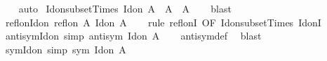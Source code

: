 \begin{isabellebody}
%
\isadelimproof
\ \ %
\endisadelimproof
%
\isatagproof
{}\isamarkupfalse%
\ auto%
\endisatagproof
{\isafoldproof}%
%
\isadelimproof
\isanewline
%
\endisadelimproof
\isanewline
{}\isamarkupfalse%
\ Id{\isacharunderscore}{\kern0pt}on{\isacharunderscore}{\kern0pt}subset{\isacharunderscore}{\kern0pt}Times{\isacharcolon}{\kern0pt}\ {\isachardoublequoteopen}Id{\isacharunderscore}{\kern0pt}on\ A\ {\isasymsubseteq}\ A\ {\isasymtimes}\ A{\isachardoublequoteclose}\isanewline
%
\isadelimproof
\ \ %
\endisadelimproof
%
\isatagproof
{}\isamarkupfalse%
\ blast%
\endisatagproof
{\isafoldproof}%
%
\isadelimproof
\isanewline
%
\endisadelimproof
\isanewline
{}\isamarkupfalse%
\ refl{\isacharunderscore}{\kern0pt}on{\isacharunderscore}{\kern0pt}Id{\isacharunderscore}{\kern0pt}on{\isacharcolon}{\kern0pt}\ {\isachardoublequoteopen}refl{\isacharunderscore}{\kern0pt}on\ A\ {\isacharparenleft}{\kern0pt}Id{\isacharunderscore}{\kern0pt}on\ A{\isacharparenright}{\kern0pt}{\isachardoublequoteclose}\isanewline
%
\isadelimproof
\ \ %
\endisadelimproof
%
\isatagproof
{}\isamarkupfalse%
\ {\isacharparenleft}{\kern0pt}rule\ refl{\isacharunderscore}{\kern0pt}onI\ {\isacharbrackleft}{\kern0pt}OF\ Id{\isacharunderscore}{\kern0pt}on{\isacharunderscore}{\kern0pt}subset{\isacharunderscore}{\kern0pt}Times\ Id{\isacharunderscore}{\kern0pt}onI{\isacharbrackright}{\kern0pt}{\isacharparenright}{\kern0pt}%
\endisatagproof
{\isafoldproof}%
%
\isadelimproof
\isanewline
%
\endisadelimproof
\isanewline
{}\isamarkupfalse%
\ antisym{\isacharunderscore}{\kern0pt}Id{\isacharunderscore}{\kern0pt}on\ {\isacharbrackleft}{\kern0pt}simp{\isacharbrackright}{\kern0pt}{\isacharcolon}{\kern0pt}\ {\isachardoublequoteopen}antisym\ {\isacharparenleft}{\kern0pt}Id{\isacharunderscore}{\kern0pt}on\ A{\isacharparenright}{\kern0pt}{\isachardoublequoteclose}\isanewline
%
\isadelimproof
\ \ %
\endisadelimproof
%
\isatagproof
{}\isamarkupfalse%
\ antisym{\isacharunderscore}{\kern0pt}def\ \isamarkupfalse%
\ blast%
\endisatagproof
{\isafoldproof}%
%
\isadelimproof
\isanewline
%
\endisadelimproof
\isanewline
{}\isamarkupfalse%
\ sym{\isacharunderscore}{\kern0pt}Id{\isacharunderscore}{\kern0pt}on\ {\isacharbrackleft}{\kern0pt}simp{\isacharbrackright}{\kern0pt}{\isacharcolon}{\kern0pt}\ {\isachardoublequoteopen}sym\ {\isacharparenleft}{\kern0pt}Id{\isacharunderscore}{\kern0pt}on\ A{\isacharparenright}{\kern0pt}{\isachardoublequoteclose}\isanewline
%
\isadelimproof
\ \ %
\endisadelimproof
%
\isatagproof

\end{isabellebody}

